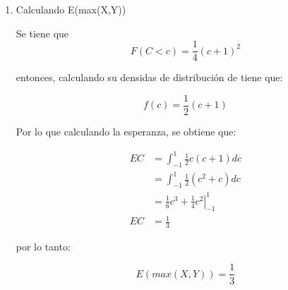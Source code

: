 \begin{enumerate}
    \item Calculando E(max(X,Y))

          Se tiene que
          \begin{equation*}
              F(C<c)  = \frac{1}{4} (c+1)^2
          \end{equation*}

          entonces, calculando su densidas de distribución de tiene que:

          \begin{equation*}
              f(c) = \frac{1}{2}(c+1)
          \end{equation*}

          Por lo que calculando la esperanza, se obtiene que:

          \begin{align}
              EC & = \int_{-1}^1 \frac{1}{2}c(c+1) dc                        \\
                 & = \int_{-1}^1 \frac{1}{2}(c^2+c) dc                       \\
                 & = \left . \frac{1}{6}c^3 +\frac{1}{4}c^2 \right|_{-1}^{1} \\
              EC & = \frac{1}{3}
          \end{align}

          por lo tanto:

          \begin{equation*}
              E(max(X,Y)) = \frac{1}{3}
          \end{equation*}
\end{enumerate}
